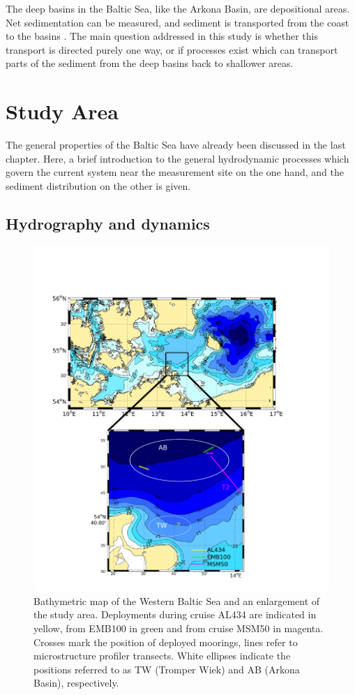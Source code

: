  The deep basins in the Baltic Sea, like the Arkona Basin, are depositional 
areas. Net sedimentation can be measured, and sediment is transported from the 
coast to the basins \citep[][]{basys1, basys2}. The main question addressed in 
this study is whether this transport is directed purely one way, or if processes 
exist which can transport parts of the sediment from the deep basins back to 
shallower areas.

\section{Study Area}

The general properties of the Baltic Sea have already been discussed in the 
last chapter. Here, a brief introduction to the general hydrodynamic 
processes which govern the current system near the measurement site on the one 
hand, and the sediment distribution on the other is given.

\subsection{Hydrography and dynamics} 

 \begin{figure}[ht]
 \centering
\includegraphics[width=18cm]{bilder/studyarea.pdf}
 \caption{Bathymetric map of the Western Baltic Sea and an enlargement of the 
study area. Deployments during cruise AL434 are indicated in yellow, from 
EMB100 in green and from cruise MSM50 in magenta. Crosses mark the 
position of deployed moorings, lines refer to microstructure profiler 
transects. White ellipses indicate the positions referred to as TW (Tromper 
Wiek) and AB (Arkona Basin), respectively.}
 \label{studyarea}
 \end{figure}
 
